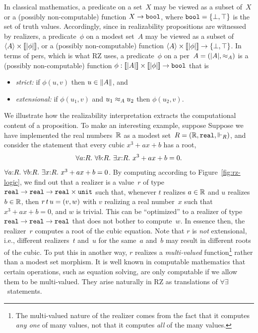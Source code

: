 In classical mathematics, a predicate on a set~$X$ may be viewed as a
subset of~$X$ or a (possibly non-computable) function $X \to \mathtt{bool}$,
where $\mathtt{bool} = \{\bot, \top\}$ is the set of truth values.
Accordingly, since in realizability propositions are witnessed by
realizers,
%
\iflong
a predicate~$\phi$ on a modest set~$A$ may be viewed as a
subset of $\langle A \rangle \times [\![|\phi|]\!]$, or a (possibly
non-computable) function $\langle A \rangle \times [\![|\phi|]\!] \to
\{\bot, \top\}$. In terms of pers, which is what RZ uses,
\fi
%
a predicate~$\phi$ on a per~$A = (|A|, {\approx_A})$ is a
(possibly non-computable) function $\phi : [\![|A|]\!] \times
[\![|\phi|]\!] \to \mathtt{bool}$ that is
%
\begin{itemize}
\item \emph{strict:} if $\phi(u,v)$ then $u \in \|A\|$, and
\item \emph{extensional:} if $\phi(u_1,v)$ and $u_1 \approx_A u_2$ then
  $\phi(u_2,v)$.
\end{itemize}

\iflong
We illustrate how the realizability interpretation extracts the
computational content of a proposition. To make an interesting
example, suppose
\else %
Suppose
\fi %
we have implemented the real
numbers~$\mathbb{R}$ as a modest set~$R = (\mathbb{R}, \mathtt{real}, {\Vdash_R})$, and
consider  
\iflong
the statement
that every cubic $x^3 + a x + b$ has a root,
%
\begin{equation}
  \label{eq:square-root}%
  \iforall{a}{R}{\iforall{b}{R}{\iexists{x}{R}{\iequal{x^3 + a x + b}{0}}}}.
\end{equation}
\else %
$\forall a{:}R.\ \forall b{:}R.\ \exists x{:}R.\ x^3 + a x + b = 0$.
\fi %
%
By computing according to Figure~\ref{fig:rz-logic}, we find out that
a realizer is a value~$r$ of type
$\mathtt{real} \to \mathtt{real} \to \mathtt{real} \times \mathtt{unit}$
such that, whenever $t$ realizes $a \in \mathbb{R}$ and $u$ realizes $b \in
\mathbb{R}$, then $r\,t\,u = (v, w)$ with $v$ realizing a real
number~$x$ such that $x^3 + a x + b = 0$, and $w$ is trivial. This
can be ``optimized'' to a realizer of type
$\mathtt{real} \to \mathtt{real} \to \mathtt{real}$ that
does not bother to compute~$w$. In essence then, the realizer~$r$
computes a root of the cubic equation. Note
that $r$ is \emph{not} extensional, i.e., different realizers~$t$
and~$u$ for the same~$a$ and~$b$ may result in different roots of the
cubic. To put this in another way, $r$ realizes a \emph{multi-valued}
function\footnote{The multi-valued nature of the realizer comes from
  the fact that it computes \emph{any one} of many values, not that it
  computes \emph{all} of the many values.} rather than a modest set
morphism. It is well known in computable mathematics that certain
operations, such as equation solving, are only computable if we allow
them to be multi-valued. They arise naturally in RZ as translations of
$\forall\exists$~statements.

